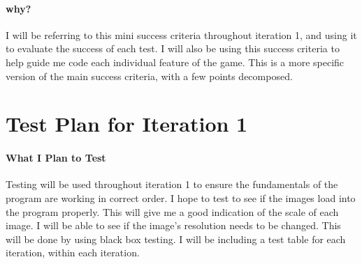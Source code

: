 \documentclass[12pt]{report}
\begin{document}
\paragraph{why?}
I will be referring to this mini success criteria throughout iteration 1, and using it to evaluate the success of each test. I will also be using this success criteria to help guide me code each individual feature of the game. This is a more specific version of the main success criteria, with a few points decomposed. 

\pagebreak

\section{Test Plan for Iteration 1}

\paragraph{What I Plan to Test}
Testing will be used throughout iteration 1 to ensure the fundamentals of the program are working in correct order. I hope to test to see if the images load into the program properly. This will give me a good indication of the scale of each image. I will be able to see if the image's resolution needs to be changed. This will be done by using black box testing. I will be including a test table for each iteration, within each iteration.
\end{document}
